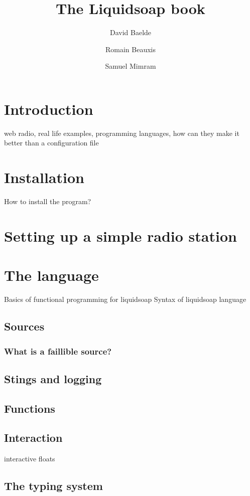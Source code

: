 \documentclass{book}
\title{The Liquidsoap book}
\author{David Baelde \and Romain Beauxis \and Samuel Mimram}
\begin{document}



\tableofcontents

\chapter{Introduction}
web radio, real life examples, programming languages, how can they make it
better than a configuration file

\chapter{Installation}
How to install the program?

\chapter{Setting up a simple radio station}

\chapter{The language}
Basics of functional programming for liquidsoap
Syntax of liquidsoap language

\section{Sources}
\subsection{What is a faillible source?}

\section{Stings and logging}

\section{Functions}

\section{Interaction}
interactive floats

\section{The typing system}
\end{document}
